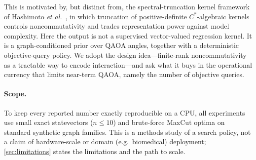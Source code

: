 \documentclass[aps,prresearch,reprint,amsmath,amssymb,floatfix,nofootinbib,superscriptaddress,longbibliography]{revtex4-2}
\theoremstyle{remark}
\newcommand{\QAOA}{\textnormal{\textsc{QAOA}}}
\begin{document}
This is motivated by, but distinct from, the spectral-truncation kernel
framework of Hashimoto \emph{et al.}~\cite{hashimoto2024spectral}, in which
truncation of positive-definite \(C^*\)-algebraic kernels controls
noncommutativity and trades representation power against model complexity.  Here
the output is not a supervised vector-valued regression kernel.  It is a
graph-conditioned prior over \QAOA{} angles, together with a deterministic
objective-query policy.  We adopt the design idea---finite-rank noncommutativity
as a tractable way to encode interaction---and ask what it buys in the operational
currency that limits near-term QAOA, namely the number of objective queries.

\paragraph{Scope.}  To keep every reported number exactly reproducible on a CPU,
all experiments use small exact statevectors (\(n\le10\)) and brute-force MaxCut
optima on standard synthetic graph families.  This is a methods study of a search
policy, not a claim of hardware-scale or domain (e.g.\ biomedical) deployment;
\cref{sec:limitations} states the limitations and the path to scale.
\end{document}
